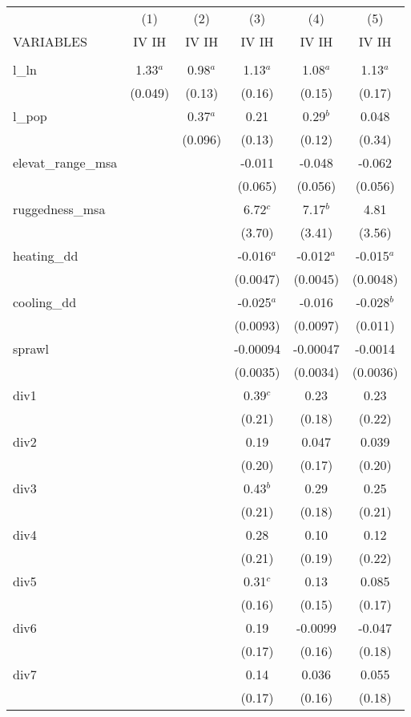 \documentclass[]{article}
\begin{document}
\begin{tabular}{lccccc} \hline
 & (1) & (2) & (3) & (4) & (5) \\
VARIABLES & IV IH & IV IH & IV IH & IV IH & IV IH \\ \hline
 &  &  &  &  &  \\
l\_ln & 1.33$^a$ & 0.98$^a$ & 1.13$^a$ & 1.08$^a$ & 1.13$^a$ \\
 & (0.049) & (0.13) & (0.16) & (0.15) & (0.17) \\
l\_pop &  & 0.37$^a$ & 0.21 & 0.29$^b$ & 0.048 \\
 &  & (0.096) & (0.13) & (0.12) & (0.34) \\
elevat\_range\_msa &  &  & -0.011 & -0.048 & -0.062 \\
 &  &  & (0.065) & (0.056) & (0.056) \\
ruggedness\_msa &  &  & 6.72$^c$ & 7.17$^b$ & 4.81 \\
 &  &  & (3.70) & (3.41) & (3.56) \\
heating\_dd &  &  & -0.016$^a$ & -0.012$^a$ & -0.015$^a$ \\
 &  &  & (0.0047) & (0.0045) & (0.0048) \\
cooling\_dd &  &  & -0.025$^a$ & -0.016 & -0.028$^b$ \\
 &  &  & (0.0093) & (0.0097) & (0.011) \\
sprawl &  &  & -0.00094 & -0.00047 & -0.0014 \\
 &  &  & (0.0035) & (0.0034) & (0.0036) \\
div1 &  &  & 0.39$^c$ & 0.23 & 0.23 \\
 &  &  & (0.21) & (0.18) & (0.22) \\
div2 &  &  & 0.19 & 0.047 & 0.039 \\
 &  &  & (0.20) & (0.17) & (0.20) \\
div3 &  &  & 0.43$^b$ & 0.29 & 0.25 \\
 &  &  & (0.21) & (0.18) & (0.21) \\
div4 &  &  & 0.28 & 0.10 & 0.12 \\
 &  &  & (0.21) & (0.19) & (0.22) \\
div5 &  &  & 0.31$^c$ & 0.13 & 0.085 \\
 &  &  & (0.16) & (0.15) & (0.17) \\
div6 &  &  & 0.19 & -0.0099 & -0.047 \\
 &  &  & (0.17) & (0.16) & (0.18) \\
div7 &  &  & 0.14 & 0.036 & 0.055 \\
 &  &  & (0.17) & (0.16) & (0.18) \\

\end{tabular}
\end{document}
